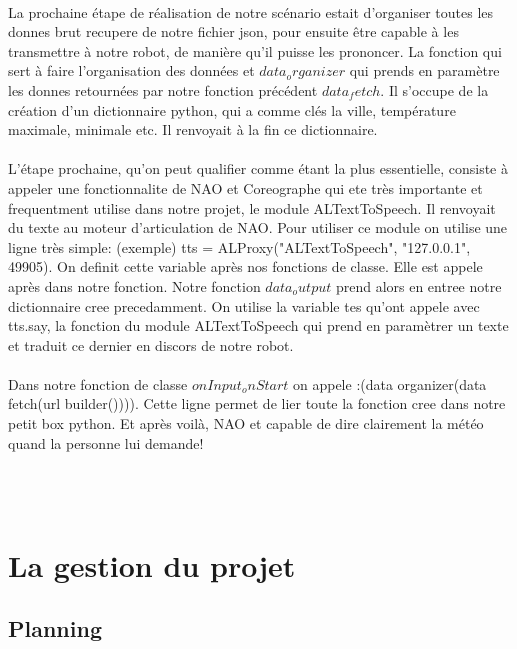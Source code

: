 \documentclass[a4paper,11pt]{article}
\begin{document}
\paragraph{} La prochaine étape de réalisation de notre scénario estait d'organiser toutes les donnes brut recupere de notre fichier json, pour ensuite être capable à les transmettre à notre robot, de manière qu'il puisse les prononcer. La fonction qui sert à faire l'organisation des données et $data_organizer$ qui prends en paramètre les donnes retournées par notre fonction précédent $data_fetch$. Il s'occupe de la création d'un dictionnaire python, qui a comme clés la ville, température maximale, minimale etc. Il renvoyait à la fin ce dictionnaire.
\paragraph{}L'étape prochaine, qu'on peut qualifier comme étant la plus essentielle, consiste à appeler une fonctionnalite de NAO et Coreographe qui ete très importante et frequentment utilise dans notre projet, le module ALTextToSpeech. Il renvoyait du texte au moteur d'articulation de NAO. Pour utiliser ce module on utilise une ligne très simple: (exemple) tts = ALProxy("ALTextToSpeech", "127.0.0.1", 49905). On definit cette variable après nos fonctions de classe. Elle est appele après dans notre fonction.
\newline Notre fonction $data_output$ prend alors en entree notre dictionnaire cree precedamment. On utilise la variable tes qu'ont appele avec tts.say, la fonction du module ALTextToSpeech qui prend en paramètrer un texte et traduit ce dernier en discors de notre robot.
\paragraph{} Dans notre fonction de classe $onInput_onStart$ on appele :(data organizer(data fetch(url builder()))). Cette ligne permet de lier toute la fonction cree dans notre petit box python.
\newline Et après voilà, NAO et capable de dire clairement la météo quand la personne lui demande!

	
~\\
~\\
\section{ La gestion du projet  }


	    \subsection{ Planning }
	    
\end{document}
